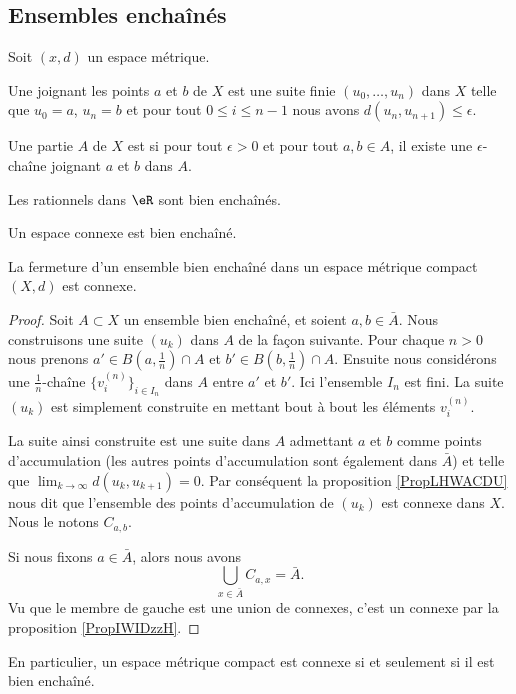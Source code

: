 \subsection{Ensembles enchaînés}

Soit \( (x,d)\) un espace métrique.
\begin{definition}
    Une  joignant les points \( a\) et \( b\) de \( X\) est une suite finie \( (u_0,\ldots, u_n)\) dans \( X\) telle que \( u_0=a\), \( u_n=b\) et pour tout \( 0\leq i\leq n-1\) nous avons \( d(u_n,u_{n+1})\leq \epsilon\).

    Une partie \( A\) de \( X\) est  si pour tout \( \epsilon>0\) et pour tout \( a,b\in A\), il existe une \( \epsilon\)-chaîne joignant \( a\) et \( b\) dans $A$.
\end{definition}
Les rationnels dans \( \eR\) sont bien enchaînés.

\begin{proposition}
    Un espace connexe est bien enchaîné.
\end{proposition}

\begin{proposition}
    La fermeture d'un ensemble bien enchaîné dans un espace métrique compact \( (X,d)\) est connexe.
\end{proposition}

\begin{proof}
    Soit \( A\subset X\) un ensemble bien enchaîné, et soient \( a,b\in \bar A\). Nous construisons une suite \( (u_k)\) dans \( A\) de la façon suivante. Pour chaque \( n>0\) nous prenons \( a'\in B(a,\frac{1}{ n })\cap A\) et \( b'\in B(b,\frac{1}{ n })\cap A\). Ensuite nous considérons une \( \frac{1}{ n }\)-chaîne \( \{ v_i^{(n)} \}_{i\in I_n}\) dans \( A\) entre \( a'\) et \( b'\). Ici l'ensemble \( I_n\) est fini. La suite \( (u_k)\) est simplement construite en mettant bout à bout les éléments \( v_i^{(n)}\).
 
    La suite ainsi construite est une suite dans \( A\) admettant \( a\) et \( b\) comme points d'accumulation (les autres points d'accumulation sont également dans \( \bar A\)) et telle que \( \lim_{k\to \infty} d(u_k,u_{k+1})=0\). Par conséquent la proposition \ref{PropLHWACDU} nous dit que l'ensemble des points d'accumulation de \( (u_k)\) est connexe dans \( X\). Nous le notons \( C_{a,b}\).

    Si nous fixons \( a\in \bar A\), alors nous avons
    \begin{equation}
        \bigcup_{x\in \bar A}C_{a,x}=\bar A.
    \end{equation}
    Vu que le membre de gauche est une union de connexes, c'est un connexe par la proposition \ref{PropIWIDzzH}.
\end{proof}
En particulier, un espace métrique compact est connexe si et seulement si il est bien enchaîné.

